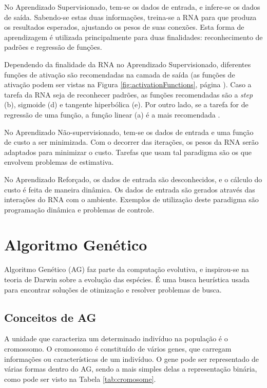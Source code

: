 \documentclass[
	12pt,					%
	openright,				%
	oneside,				%
	a4paper,				%
	bibjustif,				%
	chapter=TITLE,			%
	english,				%
	brazil,					%
	]{abntex2}
\begin{document}
	No Aprendizado Supervisionado,
	tem-se os dados de entrada, e infere-se os dados de saída.
	Sabendo-se estas duas informações, treina-se a RNA para que produza os resultados esperados,
	ajustando os pesos de suas conexões.
	Esta forma de aprendizagem é utilizada principalmente para duas finalidades:
	reconhecimento de padrões e regressão de funções.
	
	Dependendo da finalidade da RNA no Aprendizado Supervisionado,
	diferentes funções de ativação são recomendadas na camada de saída
	(as funções de ativação podem ser vistas na Figura \ref{fig:activationFunctions}, página \pageref{fig:activationFunctions}).
	Caso a tarefa da RNA seja de reconhecer padrões,
	as funções recomendadas são a \textit{step} (b), sigmoide (d) e tangente hiperbólica (e).
	Por outro lado, se a tarefa for de regressão de uma função,
	a função linear (a) é a mais recomendada \cite{researchGate}.
	
	No Aprendizado Não-supervisionado,
	tem-se os dados de entrada e uma função de custo a ser minimizada.
	Com o decorrer das iterações,
	os pesos da RNA serão adaptados para minimizar o custo.
	Tarefas que usam tal paradigma são os que envolvem problemas de estimativa.
	
	No Aprendizado Reforçado,
	os dados de entrada são desconhecidos,
	e o cálculo do custo é feita de maneira dinâmica.
	Os dados de entrada são gerados através das interações do RNA com o ambiente.
	Exemplos de utilização deste paradigma são
	programação dinâmica e problemas de controle.

	\FloatBarrier
	\section{Algoritmo Genético}
	Algoritmo Genético (AG) faz parte da computação evolutiva,
	e inspirou-se na teoria de Darwin sobre a evolução das espécies.
	É uma busca heurística usada para encontrar soluções de otimização e resolver problemas de busca. \cite{obitko}
	
	\FloatBarrier
	\subsection{Conceitos de AG}
	A unidade que caracteriza um determinado indivíduo na população é o cromossomo.
	O cromossomo é constituído de vários genes,
	que carregam informações ou características de um indivíduo. %
	O gene pode ser representado de várias formas dentro do AG,
	sendo a mais simples delas a representação binária,
	como pode ser visto na Tabela \ref{tab:cromosome}.
	
\end{document}
